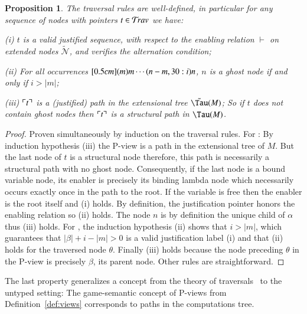 \documentclass{elsarticle}
\def\shortproof{\begin{proof}}
\def\endshortproof{\end{proof}}
\theoremstyle{plain}
\newtheorem{proposition}[theorem]{Proposition}
\theoremstyle{definition}
\newcommand\Nodes{\mathcal{N}}%
\newcommand{\ghostvar}{\theta}
\newcommand\ExtendedNodes{\tilde{\Nodes}}
\newcommand{\enables}{\vdash} %
\newcommand{\ctree}{\Tau} %
\newcommand{\exttree}{\tilde{\Tau}} %
\newcommand{\ExternalNodes}{\Nodes^{\sf ext}}
\begin{document}
\begin{proposition}
\label{prop:ulctrav_welldefined_pathview}
The traversal rules are well-defined, in particular for any sequence of nodes with pointers $t\in \mathcal{T}\!rav$ we have:
\begin{compactitem}
\item[(i)] $t$ is a valid justified sequence, with respect to
the enabling relation $\enables$ on extended nodes $\ExtendedNodes$, and verifies the alternation condition;
\item[(ii)] For all occurrences $\Pstr[0.5cm]{(m){m} \cdots (n-m,30:i){n}}$, $n$ is a ghost node if and only if $i > |m|$;
\item[(iii)] $\ulcorner t \urcorner$ is a (justified) path in the extensional tree $\exttree(M)$;
So if $t$ does not contain ghost nodes then $\ulcorner t \urcorner$ is a structural path in $\ctree(M)$.
\end{compactitem}
\end{proposition}
\shortproof
Proven simultaneously by induction on the traversal rules.
For : By induction hypothesis (iii) the P-view is a path in the extensional tree of $M$. But the last node of $t$ is a structural node therefore, this path is necessarily a structural path with no ghost node. Consequently, if the last node is a bound variable node, its enabler is precisely its binding lambda node which necessarily occurs exactly once in the path to the root. If the variable is free then the enabler is the root itself and (i) holds. By definition, the justification pointer honors the enabling relation so (ii) holds. The node $n$ is by definition the unique child of $\alpha$ thus (iii) holds.
%
For \rulenamet{Lam^\ghostvar}, the induction hypothesis (ii) shows that $i>|m|$, which guarantees that $|\beta|+i-|m|>0$ is a valid justification label (i) and that (ii) holds for the traversed node $\ghostvar$.
Finally (iii) holds because the node preceding $\ghostvar$ in the P-view is precisely $\beta$, its parent node.
%
Other rules are straightforward.
\endshortproof

The last property generalizes a concept from the theory of traversals~\cite{OngLics2006,BlumPhd} to the untyped setting: The game-semantic concept of P-views from Definition~\ref{def:views} corresponds to paths in the computations tree.
\end{document}
